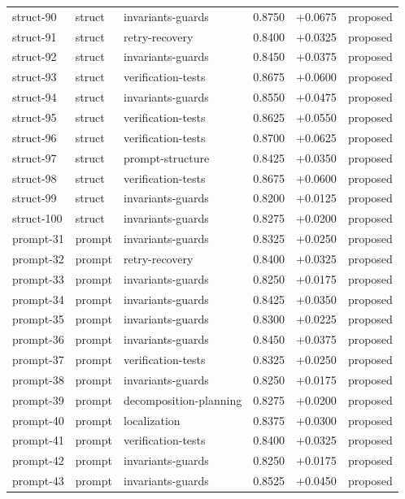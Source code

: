 \begin{center}
\begin{longtable}{llp{5.2cm}rrl}
struct-90 & struct & invariants-guards & 0.8750 & +0.0675 & proposed \\
struct-91 & struct & retry-recovery & 0.8400 & +0.0325 & proposed \\
struct-92 & struct & invariants-guards & 0.8450 & +0.0375 & proposed \\
struct-93 & struct & verification-tests & 0.8675 & +0.0600 & proposed \\
struct-94 & struct & invariants-guards & 0.8550 & +0.0475 & proposed \\
struct-95 & struct & verification-tests & 0.8625 & +0.0550 & proposed \\
struct-96 & struct & verification-tests & 0.8700 & +0.0625 & proposed \\
struct-97 & struct & prompt-structure & 0.8425 & +0.0350 & proposed \\
struct-98 & struct & verification-tests & 0.8675 & +0.0600 & proposed \\
struct-99 & struct & invariants-guards & 0.8200 & +0.0125 & proposed \\
struct-100 & struct & invariants-guards & 0.8275 & +0.0200 & proposed \\
prompt-31 & prompt & invariants-guards & 0.8325 & +0.0250 & proposed \\
prompt-32 & prompt & retry-recovery & 0.8400 & +0.0325 & proposed \\
prompt-33 & prompt & invariants-guards & 0.8250 & +0.0175 & proposed \\
prompt-34 & prompt & invariants-guards & 0.8425 & +0.0350 & proposed \\
prompt-35 & prompt & invariants-guards & 0.8300 & +0.0225 & proposed \\
prompt-36 & prompt & invariants-guards & 0.8450 & +0.0375 & proposed \\
prompt-37 & prompt & verification-tests & 0.8325 & +0.0250 & proposed \\
prompt-38 & prompt & invariants-guards & 0.8250 & +0.0175 & proposed \\
prompt-39 & prompt & decomposition-planning & 0.8275 & +0.0200 & proposed \\
prompt-40 & prompt & localization & 0.8375 & +0.0300 & proposed \\
prompt-41 & prompt & verification-tests & 0.8400 & +0.0325 & proposed \\
prompt-42 & prompt & invariants-guards & 0.8250 & +0.0175 & proposed \\
prompt-43 & prompt & invariants-guards & 0.8525 & +0.0450 & proposed \\

\end{longtable}
\end{center}
